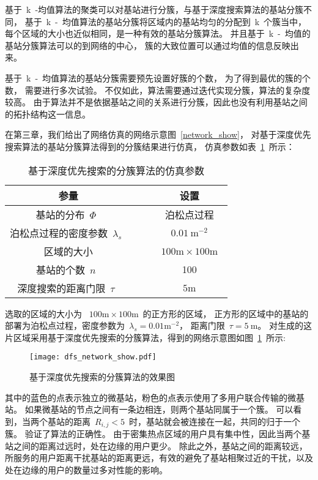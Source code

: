 基于~k~-均值算法的聚类可以对基站进行分簇，与基于深度搜索算法的基站分簇不同，
基于~k~-~均值算法的基站分簇将区域内的基站均匀的分配到~k~个簇当中，
每个区域的大小也近似相同，是一种有效的基站分簇算法。
并且基于~k~-~均值的基站分簇算法可以的到网络的中心，
簇的大致位置可以通过均值的信息反映出来。

基于~k~-~均值算法的基站分簇需要预先设置好簇的个数，
为了得到最优的簇的个数，
需要进行多次试验。
不仅如此，算法需要通过迭代实现分簇，算法的复杂度较高。
由于算法并不是依据基站之间的关系进行分簇，因此也没有利用基站之间的拓扑结构这一信息。















在第三章，我们给出了网络仿真的网络示意图~\ref{network_show}，
对基于深度优先搜索算法的基站分簇算法得到的分簇结果进行仿真，
仿真参数如表~\ref{dfs_show_sim_para}~所示：
\begin{table}[htbp]
\caption{基于深度优先搜索的分簇算法的仿真参数}
\label{dfs_show_sim_para}
\vspace{0.5em}\centering\wuhao
\begin{tabular}{cccc}
\toprule[1.5pt]
参量 & & & 设置 \\
\midrule[0.5pt]
基站的分布~$\Phi$~ & & & 泊松点过程 \\
泊松点过程的密度参数~$\lambda_s$~ & & & ~$0.01~\mathrm{m}^{-2}$~ \\
区域的大小  & & & ~$100\mathrm{m} \times 100 \mathrm{m}$~ \\
基站的个数~$n$~  & & & 100\\
深度搜索的距离门限~$\tau$~ & & & ~$5\mathrm{m}$~\\
\bottomrule[1.5pt]
\end{tabular}
\end{table}

选取的区域的大小为 ~$100\mathrm{m} \times 100 \mathrm{m}$~的正方形的区域，
正方形的区域中的基站的部署为泊松点过程，密度参数为~$\lambda_s=0.01 \mathrm{m}^{-2}$，
距离门限~$\tau=5~\mathrm{m}$。
对生成的这片区域采用基于深度优先搜索的分簇算法，得到的网络示意图如图~\ref{dfs_network_show}~所示:
\begin{figure}[htbp]
\centering
\texttt{[image: dfs\_network\_show.pdf]}
\caption{基于深度优先搜索的分簇算法的效果图}\vspace{-0.5em}
\label{dfs_network_show}
\end{figure}
其中的蓝色的点表示独立的微基站，粉色的点表示使用了多用户联合传输的微基站。
如果微基站的节点之间有一条边相连，则两个基站同属于一个簇。
可以看到，当两个基站的距离~$R_{i,j} < 5$~时，基站就会被连接在一起，共同的归于一个簇。
验证了算法的正确性。
由于密集热点区域的用户具有集中性，因此当两个基站之间的距离过远时，处在边缘的用户更少。
除此之外，基站之间的距离较远，所服务的用户距离干扰基站的距离更远，有效的避免了基站相聚过近的干扰，以及处在边缘的用户的数量过多对性能的影响。

